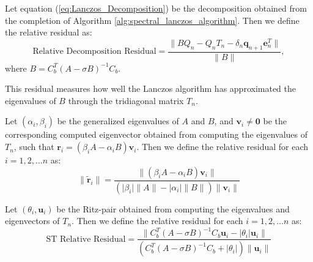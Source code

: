 \begin{definition}\label{def:DecompositionResidual}
	Let equation (\ref{eq:Lanczos_Decomposition}) be the decomposition obtained from the completion of Algorithm \ref{alg:spectral_lanczos_algorithm}. Then we define the relative residual as:
	\begin{equation}\label{eq:DecompositionResidual}
		\text{Relative Decomposition Residual} = \frac{\|BQ_n - Q_nT_n - \delta_{n}\mathbf{q}_{n+1}\mathbf{e}_n^T\|}{\|B\|},
	\end{equation}
	where $B = C_b^T (A-\sigma B)^{-1} C_b $.
\end{definition}
This residual measures how well the Lanczos algorithm has approximated the eigenvalues of $B$ through the tridiagonal matrix $T_n$.

\begin{definition}\label{def:GeneralizedRelativeResidual}
	Let $(\alpha_i, \beta_i)$ be the generalized eigenvalues of $A$ and $B$, and $\mathbf{v}_i \neq \mathbf{0}$ be the corresponding computed eigenvector obtained from computing the eigenvalues of $T_n$, such that $\mathbf{r}_i = (\beta_i A - \alpha_i B)\mathbf{v}_i$. Then we define the relative residual for each $i = 1, 2, \ldots n$ as:
	\begin{equation}\label{eq:GeneralizedResidual}
		\|\tilde{\mathbf{r}}_i\| = \frac{\| (\beta_i A - \alpha_i B)\mathbf{v}_i \| }{(\lvert \beta_i \rvert \|A\| - \lvert \alpha_i \rvert \|B\|)\|\mathbf{v}_i\| }
	\end{equation}
\end{definition}

\begin{definition}\label{def:SpectralTransformedResidual}
	Let $(\theta_i, \mathbf{u}_i)$ be the Ritz-pair obtained from computing the eigenvalues and eigenvectors of $T_n$. Then we define the relative residual for each $i = 1, 2, \ldots n$ as:
	\begin{equation}\label{eq:STResidual}
		\text{ST Relative Residual} = \frac{\| C_b^T(A - \sigma B)^{-1}C_b \mathbf{u}_i - \lvert \theta_i \rvert \mathbf{u}_i \| }{( C_b^T(A - \sigma B)^{-1}C_b + \lvert \theta_i \rvert)\|\mathbf{u}_i\| }
	\end{equation}
\end{definition}

